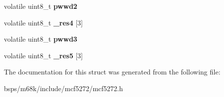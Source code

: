 \begin{DoxyCompactItemize}
volatile uint8\+\_\+t {\bfseries pwwd2}
\item 
\mbox{\label{structpwm__regs__t_aae88a4affaed1571d572f665903f0a4c}} 
volatile uint8\+\_\+t {\bfseries \+\_\+res4} \mbox{[}3\mbox{]}
\item 
\mbox{\label{structpwm__regs__t_aeaf830b20bfec8304d8eca3227ebb886}} 
volatile uint8\+\_\+t {\bfseries pwwd3}
\item 
\mbox{\label{structpwm__regs__t_a04b4a0c4113432e0acf205a9cce38db6}} 
volatile uint8\+\_\+t {\bfseries \+\_\+res5} \mbox{[}3\mbox{]}
\end{DoxyCompactItemize}


The documentation for this struct was generated from the following file\+:\begin{DoxyCompactItemize}
\item 
bsps/m68k/include/mcf5272/mcf5272.\+h\end{DoxyCompactItemize}

